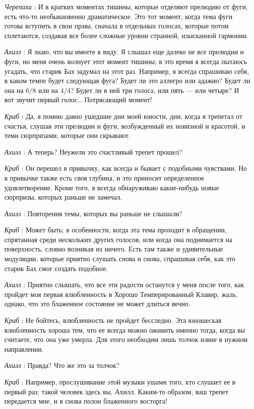 \emph{Черепаха} : И в кратких моментах тишины, которые отделяют прелюдию от фуги, есть что-то необыкновенно драматическое. Это тот момент, когда тема фуги готова вступить в свои права, сначала в отдельных голосах, которые потом сплетаются, создавая все более сложные уровни странной, изысканной гармонии.

\emph{Ахилл} : Я знаю, что вы имеете в виду. Я слышал еще далеко не все прелюдии и фуги, но меня очень волнует этот момент тишины; в это время я всегда пытаюсь угадать, что старик Бах задумал на этот раз. Например, я всегда спрашиваю себя, в каком темпе будет следующая фуга? Будет ли это аллегро или адажио? Будет ли она на 6/8 или на 4/4? Будет ли в ней три голоса, или пять --- или четыре? И вот звучит первый голос\ldots{} Потрясающий момент!

\emph{Краб} : Да, я помню давно ушедшие дни моей юности, дни, когда я трепетал от счастья, слушая эти прелюдии и фуги, возбужденный их новизной и красотой, и теми сюрпризами, которые они скрывают.

\emph{Ахилл} : А теперь? Неужели это счастливый трепет прошел?

\emph{Краб} : Он перешел в привычку, как всегда и бывает с подобными чувствами. Но в привычке также есть своя глубина, и это приносит определенное удовлетворение. Кроме того, я всегда обнаруживаю какие-нибудь новые сюрпризы, которых раньше не замечал.

\emph{Ахилл} : Повторения темы, которых вы раньше не слышали?

\emph{Краб} : Может быть; в особенности, когда эта тема проходит в обращении, спрятанная среди нескольких других голосов, или когда она поднимается на поверхность, словно возникая из ничего. Есть там также и удивительные модуляции, которые приятно слушать снова и снова, спрашивая себя, как это старик Бах смог создать подобное.

\emph{Ахилл} : Приятно слышать, что все эти радости останутся у меня после того, как пройдет моя первая влюбленность в Хорошо Темперированный Клавир, жаль, однако, что это блаженное состояние не может длиться вечно.

\emph{Краб} : Не бойтесь, влюбленность не пройдет бесследно. Эта юношеская влюбленность хороша тем, что ее всегда можно оживить именно тогда, когда вы считаете, что она уже умерла. Для этого необходим лишь толчок извне в нужном направлении.

\emph{Ахилл} : Правда? Что же это за толчок?

\emph{Краб} : Например, прослушивание этой музыки ушами того, кто слушает ее в первый раз; такой человек здесь вы, Ахилл. Каким-то образом, ваш трепет передается мне, и я снова полон блаженного восторга!

